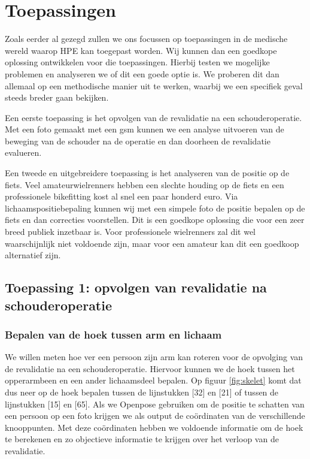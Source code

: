 \documentclass[a4paper,twoside,kulak]{kulakreport}
\begin{document}
\chapter{Toepassingen}
Zoals eerder al gezegd zullen we ons focussen op toepassingen in de medische wereld waarop HPE kan toegepast worden. Wij kunnen dan een goedkope oplossing ontwikkelen voor die toepassingen. Hierbij testen we mogelijke problemen en analyseren we of dit  een goede optie is. We proberen dit dan allemaal op een methodische manier uit te werken, waarbij we een specifiek geval steeds breder gaan bekijken.


Een eerste toepassing is het opvolgen van de revalidatie na een schouderoperatie. Met een foto gemaakt met een gsm kunnen we een analyse uitvoeren van de beweging van de schouder na de operatie en dan doorheen de revalidatie evalueren.

Een tweede en uitgebreidere toepassing is het analyseren van de positie op de fiets. Veel amateurwielrenners hebben een slechte houding op de fiets en een professionele bikefitting kost al snel een paar honderd euro. Via lichaamspositiebepaling kunnen wij met een simpele foto de positie bepalen op de fiets en dan correcties voorstellen. Dit is een goedkope oplossing die voor een zeer breed publiek inzetbaar is. Voor professionele wielrenners zal dit wel waarschijnlijk niet voldoende zijn, maar voor een amateur kan dit een goedkoop alternatief zijn.



\section{Toepassing 1: opvolgen van revalidatie na schouderoperatie}
\subsection{Bepalen van de hoek tussen arm en lichaam}

We willen meten hoe ver een persoon zijn arm kan roteren voor de opvolging van de revalidatie na een schouderoperatie. Hiervoor kunnen we de hoek tussen het opperarmbeen en een ander lichaamsdeel bepalen. Op figuur \ref{fig:skelet} komt dat dus neer op de hoek bepalen tussen de lijnstukken [32] en [21] of tussen de lijnstukken [15] en [65]. Als we Openpose gebruiken om de positie te schatten van een persoon op een foto krijgen we als output de coördinaten van de verschillende knooppunten. Met deze coördinaten hebben we voldoende informatie om de hoek te berekenen en zo objectieve informatie te krijgen over het verloop van de revalidatie.
\end{document}
